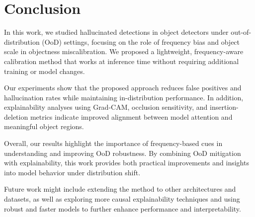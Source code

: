 \section{Conclusion}

In this work, we studied hallucinated detections in object detectors under out-of-distribution (OoD) settings, focusing on the role of frequency bias and object scale in objectness miscalibration. We proposed a lightweight, frequency-aware calibration method that works at inference time without requiring additional training or model changes.

Our experiments show that the proposed approach reduces false positives and hallucination rates while maintaining in-distribution performance. In addition, explainability analyses using Grad-CAM, occlusion sensitivity, and insertion-deletion metrics indicate improved alignment between model attention and meaningful object regions.

Overall, our results highlight the importance of frequency-based cues in understanding and improving OoD robustness. By combining OoD mitigation with explainability, this work provides both practical improvements and insights into model behavior under distribution shift.

Future work might include extending the method to other architectures and datasets, as well as exploring more causal explainability techniques and using robust and faster models to further enhance performance and interpretability.